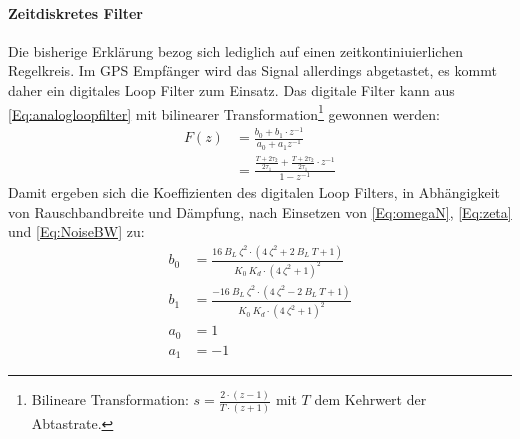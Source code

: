 \paragraph{Zeitdiskretes Filter}
Die bisherige Erklärung bezog sich lediglich auf einen zeitkontiniuierlichen Regelkreis. Im GPS Empfänger wird das Signal allerdings abgetastet, es kommt daher ein digitales Loop Filter zum Einsatz. Das digitale Filter kann aus \eqref{Eq:analogloopfilter} mit bilinearer Transformation\footnote{Bilineare Transformation: $s=\frac{2\cdot(z-1)}{T\cdot(z+1)}$ mit $T$ dem Kehrwert der Abtastrate.} gewonnen werden:
\begin{align}
    F(z) &= \frac{b_0+b_1 \cdot z^{-1}}{a_0 + a_1 z^{-1}}\\
         &= \frac{\frac{T+2\tau_2}{2 \tau_1}+\frac{T+2\tau_2}{2 \tau_1} \cdot z^{-1}}{1-z^{-1}}
\end{align}
Damit ergeben sich die Koeffizienten des digitalen Loop Filters, in Abhängigkeit von Rauschbandbreite und Dämpfung, nach Einsetzen von \eqref{Eq:omegaN},  \eqref{Eq:zeta} und \eqref{Eq:NoiseBW} zu:
\begin{align}
    b_0 &= \frac{16 ~B_L ~\zeta^2\cdot(4~\zeta^2+2 ~B_L~ T + 1)}{K_0 ~K_d \cdot (4 ~\zeta^2+1)^2} \label{Eq:FilterB0}\\
    b_1 &= \frac{-16 ~B_L ~\zeta^2\cdot(4~\zeta^2-2 ~B_L~ T + 1)}{K_0 ~K_d \cdot (4 ~\zeta^2+1)^2} \label{Eq:FilterB1}\\
    a_0 &= 1 \label{Eq:FilterA0}\\
    a_1 &= -1 \label{Eq:FilterA1}
\end{align}
